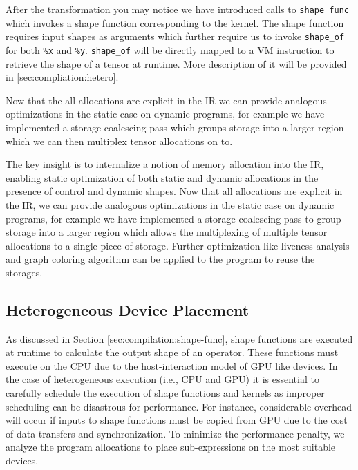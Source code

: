 After the transformation you may notice we have introduced calls to \verb|shape_func| which
  invokes a shape function corresponding to the kernel.
The shape function requires input shapes as arguments which further require us to invoke \verb|shape_of|
  for both \verb|%x| and \verb|%y|.
\verb|shape_of| will be directly mapped to a VM instruction to retrieve the shape of a tensor at runtime.
More description of it will be provided in \autoref{sec:compliation:hetero}.

Now that the all allocations are explicit in the IR we can provide analogous optimizations in the static
case on dynamic programs, for example we have implemented a storage coalescing pass which groups storage
into a larger region which we can then multiplex tensor allocations on to.

The key insight is to internalize a notion of memory allocation into the IR,
  enabling static optimization of both static and dynamic allocations in the presence of control and dynamic shapes.
Now that all allocations are explicit in the IR, we can provide analogous optimizations in the static case on dynamic programs,
  for example we have implemented a storage coalescing pass to group storage
  into a larger region which allows the multiplexing of multiple tensor allocations to a single piece of storage.
Further optimization like liveness analysis and graph coloring algorithm can be applied to the program to reuse the storages.

\subsection{Heterogeneous Device Placement}
\label{sec:optimizations:hetero}

As discussed in Section \autoref{sec:compilation:shape-func}, shape functions are executed at runtime to
  calculate the output shape of an operator.
These functions must execute on the CPU due to the host-interaction model of GPU like devices.
In the case of heterogeneous execution (i.e., CPU and GPU) it is essential to carefully schedule
  the execution of shape functions and kernels as improper scheduling can be disastrous for performance.
For instance, considerable overhead will occur if inputs to shape functions must be copied from
  GPU due to the cost of data transfers and synchronization.
To minimize the performance penalty, we analyze the program allocations to place sub-expressions on the most suitable devices.


